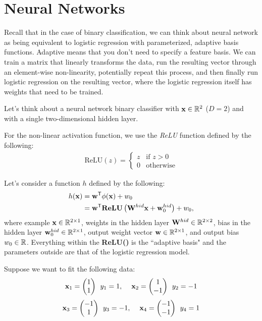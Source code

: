 \documentclass[11pt,letterpaper]{article}
\begin{document}
\newpage
\section{Neural Networks}

Recall that in the case of binary classification, we can think about
neural network as being equivalent to logistic regression with
parameterized, adaptive basis functions. Adaptive means that you don't need to specify a feature basis.
We can train a matrix that linearly transforms the data, run the resulting vector through an element-wise
non-linearity, potentially repeat this process, and then finally run logistic regression on the resulting vector,
where the logistic regression itself has weights that need to be trained.

Let's think about a neural network binary classifier with $\mathbf{x}\in 
\mathbb{R}^2$ ($D=2$) and with a single two-dimensional hidden layer.

For the non-linear activation function, 
we use the {\it ReLU} function defined by the following:
%
\begin{align}
\text{ReLU}(z) = \begin{cases} z & \text{if } z > 0 \\ 0 & \text{otherwise} \end{cases}
\end{align}

Let's consider a function $h$ defined by the following:
%
\begin{align}
h({\bf x}) &= \mathbf{w}^{\mathsf{T}} \mathbf{\phi}(\mathbf{x}) + w_0 \\
           &= \mathbf{w}^{\mathsf{T}}\textbf{ReLU}\left(\mathbf{W}^{hid} \mathbf{x} + \mathbf{w}_0^{hid}\right) + w_0,
\end{align}
%
where example $\mathbf{x} \in \mathbb{R}^{2 \times 1}$, 
weights in the hidden layer $\mathbf{W}^{hid} \in \mathbb{R}^{2 \times 2}$,
bias in the hidden layer $\mathbf{w}^{hid}_0 \in \mathbb{R}^{2 \times 1}$, 
output weight vector $\mathbf{w} \in \mathbb{R}^{2 \times 1}$, and
output bias $w_0 \in \mathbb{R}$. Everything within the \textbf{ReLU()}
is the ``adaptive basis" and the parameters outside are that of the logistic regression model.

\noindent Suppose we want to fit the following data:
%
\[\boldx_1 = \left(\begin{matrix} 1 \\ 1\end{matrix} \right)\:\: y_1 = 1, \hspace{1pc} \boldx_2 = \left(\begin{matrix} 1 \\ -1\end{matrix} \right)\:\: y_2 = -1\]
\[\boldx_3 = \left(\begin{matrix} -1 \\ 1\end{matrix} \right)\:\: y_3 = -1, \hspace{1pc} \boldx_4 = \left(\begin{matrix} -1 \\ -1\end{matrix} \right)\:\: y_4 = 1\]
\end{document}
